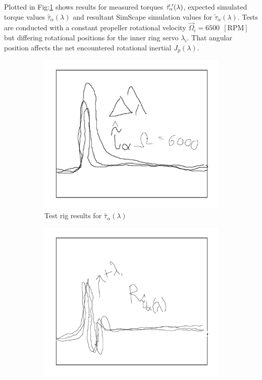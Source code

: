\par
Plotted in Fig:\ref{fig:tau-alpha} shows results for measured torques $\vec{\tau}_\alpha\text{}\hspace{-2pt}'(\lambda)$, expected simulated torque values $\hat{\tau}_\alpha(\lambda)$ and resultant SimScape simulation values for $\tilde{\tau}_\alpha(\lambda)$. Tests are conducted with a constant propeller rotational velocity $\vec{\Omega}_i=6500~~[\text{RPM}]$ but differing rotational positions for the inner ring servo $\lambda_i$. That angular position affects the net encountered rotational inertial $J_\text{p}(\lambda)$.
\begin{figure}[htbp]
\centering
\begin{subfigure}{0.49\textwidth}
\centering
\includegraphics[width=\textwidth]{graphs/tau-alpha}
\caption{Test rig results for $\hat{\tau}_\alpha(\lambda)$}
\label{fig:tau-alpha}
\end{subfigure}
\begin{subfigure}{0.49\textwidth}
\centering
\includegraphics[width=\textwidth]{graphs/tau-alpha-r}

\end{subfigure}
\end{figure}
